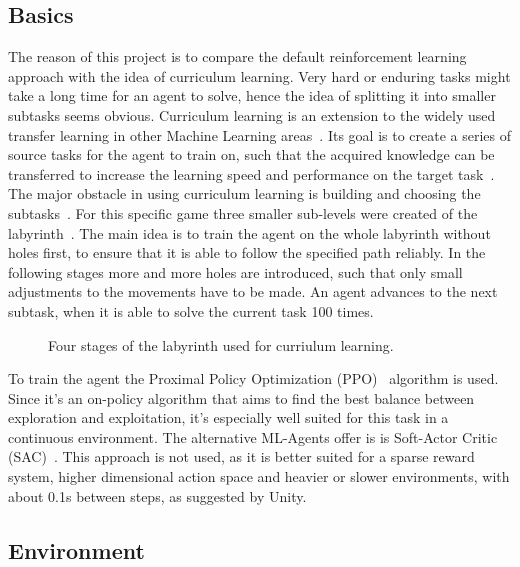 \subsection{Basics}\label{subsec:basics}
The reason of this project is to compare the default reinforcement learning approach with the idea of curriculum learning.
Very hard or enduring tasks might take a long time for an agent to solve, hence the idea of splitting it into smaller subtasks seems obvious.
Curriculum learning is an extension to the widely used transfer learning in other Machine Learning areas~\cite{wiering_transfer_2012}.
Its goal is to create a series of source tasks for the agent to train on, such that the acquired knowledge
can be transferred to increase the learning speed and performance on the target task~\cite{narvekar_learning_2018}.
The major obstacle in using curriculum learning is building and choosing the subtasks~\cite{narvekar2016source}.
For this specific game three smaller sub-levels were created of the labyrinth~\cite{fig:unity_levels}.
The main idea is to train the agent on the whole labyrinth without holes first, to ensure that it is able to follow the specified path reliably.
In the following stages more and more holes are introduced, such that only small adjustments to the movements have to be made.
An agent advances to the next subtask, when it is able to solve the current task 100 times.

\begin{figure}[h]
    \centering
    \caption{Four stages of the labyrinth used for curriulum learning.}
    \label{fig:unity_levels}
\end{figure}

To train the agent the Proximal Policy Optimization (PPO)~\cite{schulman_proximal_2017} algorithm is used.
Since it's an on-policy algorithm that aims to find the best balance between exploration and exploitation, it's especially
well suited for this task in a continuous environment.
The alternative ML-Agents offer is is Soft-Actor Critic (SAC)~\cite{haarnoja_soft_2018}.
This approach is not used, as it is better suited for a sparse reward system, higher dimensional action space and heavier or slower
environments, with about 0.1s between steps, as suggested by Unity.

\subsection{Environment}\label{subsec:environment}

